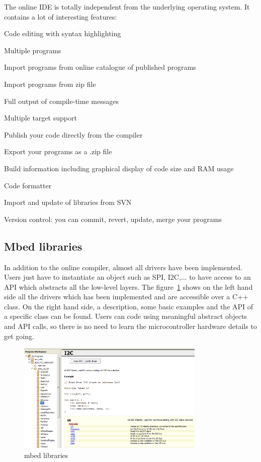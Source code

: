 \documentclass[pdftex,10pt,a4paper]{report}
\newenvironment{packed_item}{
\begin{itemize}
  \setlength{\itemsep}{1pt}
  \setlength{\parskip}{0pt}
  \setlength{\parsep}{0pt}
}{\end{itemize}}
\begin{document}
The online IDE is totally independent from the underlying operating system. It contains a lot of interesting features:
\begin{packed_item}
	\item Code editing with syntax highlighting
	\item Multiple programs
	\item Import programs from online catalogue of published programs
	\item Import programs from zip file
	\item Full output of compile-time messages
	\item Multiple target support
	\item Publish your code directly from the compiler
	\item Export your programs as a .zip file
	\item Build information including graphical display of code size and RAM usage
	\item Code formatter
	\item Import and update of libraries from SVN
	\item Version control: you can commit, revert, update, merge your programs
\end{packed_item}

\subsection{Mbed libraries}
In addition to the online compiler, almost all drivers have been implemented. Users just have to instantiate an object such as SPI, I2C,... to have access to an API which abstracts all the low-level layers. The figure~\ref{mbed libraries} shows on the left hand side all the drivers which has been implemented and are accessible over a C++ class. On the right hand side, a description, some basic examples and the API of a specific class can be found. Users can code using meaningful abstract objects and API calls, so there is no need to learn the microcontroller hardware details to get going.\\


\begin{figure}[h!]
\centering
\includegraphics[width=0.8\textwidth]{./libraries.png}
\caption{mbed libraries}
\label{mbed libraries}
\end{figure}
\end{document}
